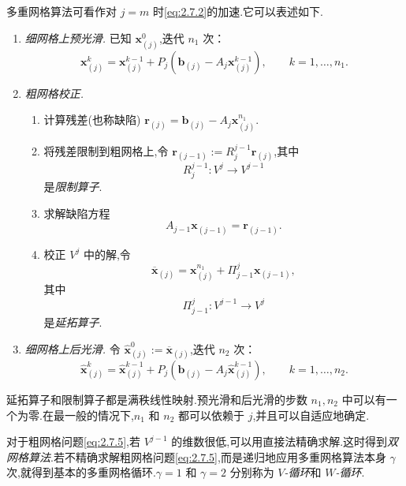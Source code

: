 多重网格算法可看作对 \(j=m\) 时\eqref{eq:2.7.2}的加速.它可以表述如下.

\begin{enumerate}[label=\arabic*.,leftmargin=*]
  \item \emph{细网格上预光滑.}
  已知 \(\boldsymbol{x}_{(j)}^0\),迭代 \(n_1\) 次：
  \begin{equation}\label{eq:2.7.4}
    \boldsymbol{x}_{(j)}^k=\boldsymbol{x}_{(j)}^{k-1}
      +P_j(\boldsymbol{b}_{(j)}-A_j\boldsymbol{x}_{(j)}^{k-1}),\qquad k=1,\ldots,n_1.
  \end{equation}
  \item \emph{粗网格校正.}
  \begin{enumerate}[label=(\roman*),leftmargin=*]
    \item 计算残差(也称缺陷)
    \(\boldsymbol{r}_{(j)}=\boldsymbol{b}_{(j)}-A_j\boldsymbol{x}_{(j)}^{n_1}\).
    \item 将残差限制到粗网格上,令
    \(\boldsymbol{r}_{(j-1)}:=R_j^{j-1}\boldsymbol{r}_{(j)}\),其中
    \[
      R_j^{j-1}\colon V^j\to V^{j-1}
    \]
    是\emph{限制算子}.
    \item 求解缺陷方程
    \begin{equation}\label{eq:2.7.5}
      A_{j-1}\boldsymbol{x}_{(j-1)}=\boldsymbol{r}_{(j-1)}.
    \end{equation}
    \item 校正 \(V^j\) 中的解,令
    \[
      \overline{\boldsymbol{x}}_{(j)}
        =\boldsymbol{x}_{(j)}^{n_1}+\Pi_{j-1}^j\boldsymbol{x}_{(j-1)},
    \]
    其中
    \[
      \Pi_{j-1}^j\colon V^{j-1}\to V^j
    \]
    是\emph{延拓算子}.
  \end{enumerate}
  \item \emph{细网格上后光滑.}
  令 \(\widehat{\boldsymbol{x}}_{(j)}^0:=\overline{\boldsymbol{x}}_{(j)}\),迭代 \(n_2\) 次：
  \begin{equation}\label{eq:2.7.6}
    \widehat{\boldsymbol{x}}_{(j)}^k=\widehat{\boldsymbol{x}}_{(j)}^{k-1}
      +P_j(\boldsymbol{b}_{(j)}-A_j\widehat{\boldsymbol{x}}_{(j)}^{k-1}),
      \qquad k=1,\ldots,n_2.
  \end{equation}
\end{enumerate}

延拓算子和限制算子都是满秩线性映射.预光滑和后光滑的步数 \(n_1,n_2\) 中可以有一个为零.在最一般的情况下,\(n_1\) 和 \(n_2\) 都可以依赖于 \(j\),并且可以自适应地确定.

对于粗网格问题\eqref{eq:2.7.5},若 \(V^{j-1}\) 的维数很低,可以用直接法精确求解.这时得到\emph{双网格算法}.若不精确求解粗网格问题\eqref{eq:2.7.5},而是递归地应用多重网格算法本身 \(\gamma\) 次,就得到基本的多重网格循环.\(\gamma=1\) 和 \(\gamma=2\) 分别称为 \(V\)\emph{-循环}和 \(W\)\emph{-循环}.

